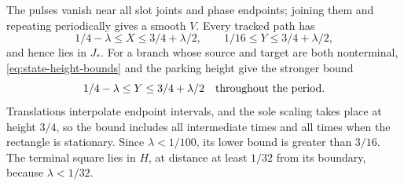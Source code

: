 \documentclass[11pt]{article}
\theoremstyle{remark}\newtheorem{remark}[theorem]{Remark}
\begin{document}
The pulses vanish near all slot joints and phase endpoints; joining
them and repeating periodically gives a smooth $V$.  Every tracked
path has
\[
 1/4-\lambda\le X\le3/4+\lambda/2,
 \qquad 1/16\le Y\le3/4+\lambda/2,
\]
and hence lies in $J_*$.  For a branch whose source and target are
both nonterminal, \eqref{eq:state-height-bounds} and the parking height
give the stronger bound
\begin{equation}\label{eq:no-transient-halting}
 1/4-\lambda\le Y\le3/4+\lambda/2
 \quad\hbox{throughout the period}.
\end{equation}
Translations interpolate endpoint intervals, and the sole scaling
takes place at height $3/4$, so the bound includes all intermediate
times and all times when the rectangle is stationary.  Since
$\lambda<1/100$, its lower bound is greater than $3/16$.
The terminal square lies in $H$, at distance at least $1/32$ from
its boundary, because $\lambda<1/32$.
\end{document}
